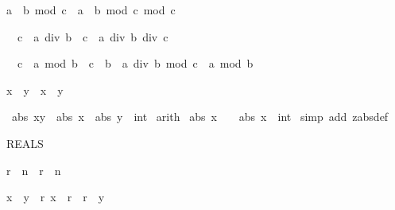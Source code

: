 \begin{isabellebody}
\begin{isamarkuptext}
\begin{isabelle}%
a\ {\isacharasterisk}\ b\ mod\ c\ {\isacharequal}\ a\ {\isacharasterisk}\ {\isacharparenleft}b\ mod\ c{\isacharparenright}\ mod\ c%
\end{isabelle}

\begin{isabelle}%
{\isacharhash}{}\ {\isacharless}\ c\ {\isasymLongrightarrow}\ a\ div\ {\isacharparenleft}b\ {\isacharasterisk}\ c{\isacharparenright}\ {\isacharequal}\ a\ div\ b\ div\ c%
\end{isabelle}

\begin{isabelle}%
{\isacharhash}{}\ {\isacharless}\ c\ {\isasymLongrightarrow}\ a\ mod\ {\isacharparenleft}b\ {\isacharasterisk}\ c{\isacharparenright}\ {\isacharequal}\ b\ {\isacharasterisk}\ {\isacharparenleft}a\ div\ b\ mod\ c{\isacharparenright}\ {\isacharplus}\ a\ mod\ b%
\end{isabelle}

\begin{isabelle}%
{\isasymbar}x\ {\isacharasterisk}\ y{\isasymbar}\ {\isacharequal}\ {\isasymbar}x{\isasymbar}\ {\isacharasterisk}\ {\isasymbar}y{\isasymbar}%
\end{isabelle}
%
\end{isamarkuptext}%
\ {\isachardoublequote}abs\ {\isacharparenleft}x{\isacharplus}y{\isacharparenright}\ {\isasymle}\ abs\ x\ {\isacharplus}\ abs\ {\isacharparenleft}y\ {\isacharcolon}{\isacharcolon}\ int{\isacharparenright}{\isachardoublequote}\isanewline
{}\ arith\isanewline
\isanewline
{}\ {\isachardoublequote}abs\ {\isacharparenleft}{\isacharhash}{}{\isacharasterisk}x{\isacharparenright}\ {\isacharequal}\ {\isacharhash}{}\ {\isacharasterisk}\ abs\ {\isacharparenleft}x\ {\isacharcolon}{\isacharcolon}\ int{\isacharparenright}{\isachardoublequote}\isanewline
{}\ {\isacharparenleft}simp\ add{\isacharcolon}\ zabs{\isacharunderscore}def{\isacharparenright}%
\begin{isamarkuptext}%
REALS

\begin{isabelle}%
{\isasymbar}r{\isasymbar}\ {\isacharcircum}\ n\ {\isacharequal}\ {\isasymbar}r\ {\isacharcircum}\ n{\isasymbar}%
\end{isabelle}

\begin{isabelle}%
x\ {\isacharless}\ y\ {\isasymLongrightarrow}\ {\isasymexists}r{\isachardot}\ x\ {\isacharless}\ r\ {\isasymand}\ r\ {\isacharless}\ y%
\end{isabelle}


\end{isamarkuptext}
\end{isabellebody}

